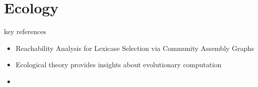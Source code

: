 \section{Ecology}

key references
\begin{itemize}
  \item Reachability Analysis for Lexicase Selection via Community Assembly Graphs \citep{dolson2024reachability}
  \item Ecological theory provides insights about evolutionary computation \citep{dolson2018ecological}
  \item
\end{itemize}
